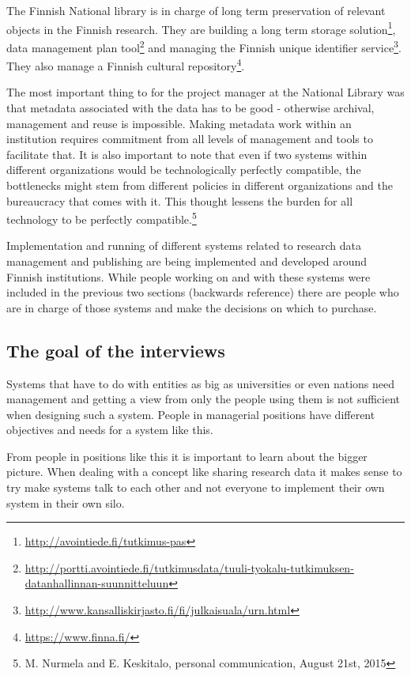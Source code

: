The Finnish National library is in charge of long term preservation of relevant
objects in the Finnish research. They are building a long term storage
solution\footnote{\url{http://avointiede.fi/tutkimus-pas}}, data management
plan tool\footnote{\sloppy\url{http://portti.avointiede.fi/tutkimusdata/tuuli-tyokalu-tutkimuksen-datanhallinnan-suunnitteluun}} and managing the Finnish unique identifier
service\footnote{\url{http://www.kansalliskirjasto.fi/fi/julkaisuala/urn.html}}.
They also manage a Finnish cultural repository\footnote{\url{https://www.finna.fi/}}.

The most important thing to for the project manager at the National Library
was that metadata associated with the data has to be good - otherwise
archival, management and reuse is impossible. Making metadata work within an
institution requires commitment from all levels of management and tools to
facilitate that. It is also important to note that even if two systems within
different organizations would be technologically perfectly compatible,
the bottlenecks might stem from different policies in different organizations
and the bureaucracy that comes with it. This thought lessens the burden for all
technology to be perfectly compatible.\footnote{M. Nurmela and E. Keskitalo, personal communication, August 21st, 2015}

\iffalse
Implementation and running of different systems related to research data
management and publishing are being implemented and developed around Finnish
institutions. While people working on and with these systems were included in
the previous two sections (backwards reference) there are people who are in
charge of those systems and make the decisions on which to purchase.

\subsection{The goal of the interviews}

Systems that have to do with entities as big as universities or even nations
need management and getting a view from only the people using them is not
sufficient when designing such a system. People in managerial positions have
different objectives and needs for a system like this.

From people in positions like this it is important to learn about the bigger
picture. When dealing with a concept like sharing research data it makes sense
to try make systems talk to each other and not everyone to implement their own
system in their own silo.

